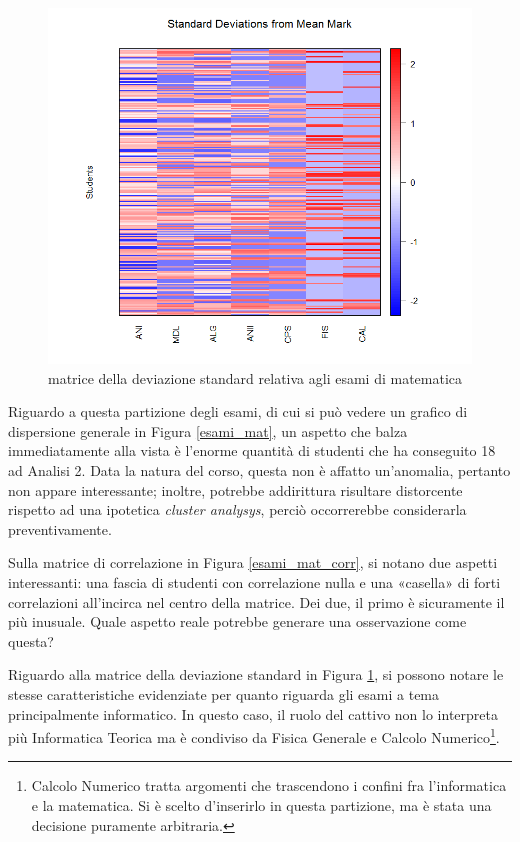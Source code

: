                 \begin{figure}
                    \centering
                    \caption{matrice della deviazione standard relativa agli esami di matematica}
                    \label{esami_mat_stddev}
                	\includegraphics[scale=0.32]{img/std_dev_matrix_3.png}
                \end{figure}

                Riguardo a questa partizione degli esami, di cui si può vedere un grafico di dispersione generale in Figura \ref{esami_mat}, un aspetto che balza immediatamente alla vista è l’enorme quantità di studenti che ha conseguito 18 ad Analisi 2. Data la natura del corso, questa non è affatto un'anomalia, pertanto non appare interessante; inoltre, potrebbe addirittura risultare distorcente rispetto ad una ipotetica \textit{cluster analysys}, perciò occorrerebbe considerarla preventivamente.

                Sulla matrice di correlazione in Figura \ref{esami_mat_corr}, si notano due aspetti interessanti: una fascia di studenti con correlazione nulla e una «casella» di forti correlazioni all’incirca nel centro della matrice. Dei due, il primo è sicuramente il più inusuale. Quale aspetto reale potrebbe generare una osservazione come questa?

                Riguardo alla matrice della deviazione standard in Figura \ref{esami_mat_stddev}, si possono notare le stesse caratteristiche evidenziate per quanto riguarda gli esami a tema principalmente informatico. In questo caso, il ruolo del cattivo non lo interpreta più Informatica Teorica ma è condiviso da Fisica Generale e Calcolo Numerico\footnote{Calcolo Numerico tratta argomenti che trascendono i confini fra l’informatica e la matematica. Si è scelto d'inserirlo in questa partizione, ma è stata una decisione puramente arbitraria.}.

